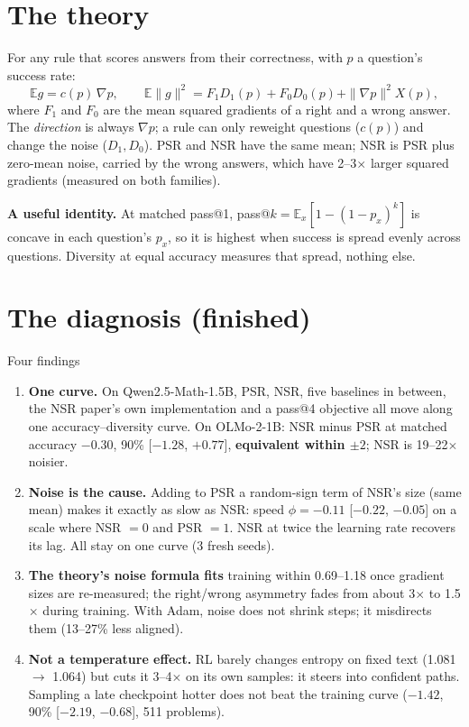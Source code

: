 \documentclass[11pt]{article}
\newcommand{\E}{\mathbb{E}}
\begin{document}
\section{The theory}
For any rule that scores answers from their correctness, with $p$ a question's success rate:
\[\E g=c(p)\,\nabla p,\qquad \E\|g\|^2=F_1D_1(p)+F_0D_0(p)+\|\nabla p\|^2X(p),\]
where $F_1$ and $F_0$ are the mean squared gradients of a right and a wrong answer. The \emph{direction} is always $\nabla p$; a rule can only reweight questions ($c(p)$) and change the noise ($D_1, D_0$). PSR and NSR have the same mean; NSR is PSR plus zero-mean noise, carried by the wrong answers, which have 2--3$\times$ larger squared gradients (measured on both families).

\textbf{A useful identity.} At matched pass@1, pass@$k=\E_x[1-(1-p_x)^k]$ is concave in each question's $p_x$, so it is highest when success is spread evenly across questions. Diversity at equal accuracy measures that spread, nothing else.

\section{The diagnosis (finished)}
\begin{found}{Four findings}
\begin{enumerate}
\item \textbf{One curve.} On Qwen2.5-Math-1.5B, PSR, NSR, five baselines in between, the NSR paper's own implementation and a pass@4 objective all move along one accuracy--diversity curve. On OLMo-2-1B: NSR minus PSR at matched accuracy $-0.30$, 90\% [$-1.28$, $+0.77$], \textbf{equivalent within $\pm2$}; NSR is 19--22$\times$ noisier.
\item \textbf{Noise is the cause.} Adding to PSR a random-sign term of NSR's size (same mean) makes it exactly as slow as NSR: speed $\phi=-0.11$ [$-0.22$, $-0.05$] on a scale where NSR $=0$ and PSR $=1$. NSR at twice the learning rate recovers its lag. All stay on one curve (3 fresh seeds).
\item \textbf{The theory's noise formula fits} training within 0.69--1.18 once gradient sizes are re-measured; the right/wrong asymmetry fades from about 3$\times$ to 1.5$\times$ during training. With Adam, noise does not shrink steps; it misdirects them (13--27\% less aligned).
\item \textbf{Not a temperature effect.} RL barely changes entropy on fixed text (1.081 $\to$ 1.064) but cuts it 3--4$\times$ on its own samples: it steers into confident paths. Sampling a late checkpoint hotter does not beat the training curve ($-1.42$, 90\% [$-2.19$, $-0.68$], 511 problems).
\end{enumerate}
\end{found}
\end{document}
